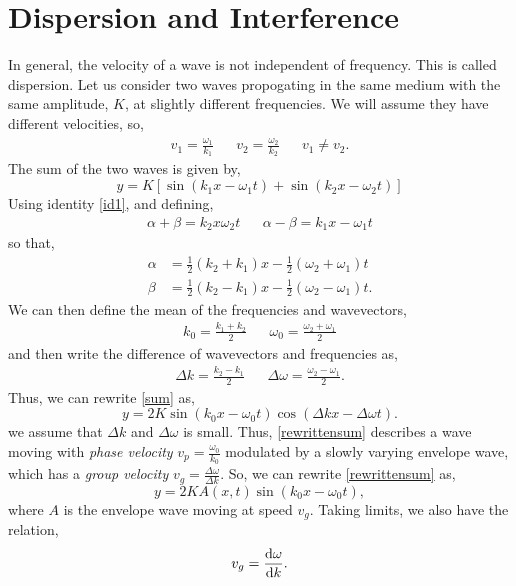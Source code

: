 \documentclass{book}
\begin{document}
\chapter{Dispersion and Interference}
In general, the velocity of a wave is not independent of frequency. This is called dispersion. Let us consider two waves propogating in the same medium with the same amplitude, $K$, at slightly different frequencies. We will assume they have different velocities, so,
\begin{align}
	v_1 = \frac{\omega_1}{k_1} && v_2 = \frac{\omega_2}{k_2} && v_1 \neq v_2.
\end{align}
The sum of the two waves is given by,
\begin{equation}
	y = K\left[\sin(k_1x -\omega_1t) + \sin(k_2x - \omega_2t)\right] \label{sum}
\end{equation}
Using identity \eqref{id1}, and defining,
\begin{align}
	\alpha + \beta = k_2x\omega_2t && \alpha - \beta = k_1x -\omega_1 t
\end{align}
so that,
\begin{align}
	\alpha & = \frac{1}{2}(k_2 + k_1)x - \frac{1}{2}(\omega_2 + \omega_1)t \\
	\beta & = \frac{1}{2}(k_2 - k_1)x - \frac{1}{2}(\omega_2 - \omega_1)t.
\end{align}
We can then define the mean of the frequencies and wavevectors,
\begin{align}
	k_0 = \frac{k_1 + k_2}{2} && \omega_0 = \frac{\omega_2 + \omega_1}{2}
\end{align}
and then write the difference of wavevectors and frequencies as,
\begin{align}
	\Delta k = \frac{k_2 - k_1}{2} && \Delta \omega = \frac{\omega_2 - \omega_1}{2}.
\end{align}
Thus, we can rewrite \eqref{sum} as,
\begin{equation}
	y = 2K\sin(k_0x - \omega_0 t)\cos(\Delta k x - \Delta\omega t).\label{rewrittensum}
\end{equation}
we assume that $\Delta k$ and $\Delta \omega$ is small. Thus, \eqref{rewrittensum} describes a wave moving with \textit{phase velocity} $v_p = \frac{\omega_0}{k_0}$ modulated by a slowly varying envelope wave, which has a \textit{group velocity} $v_g= \frac{\Delta \omega}{\Delta k}$. So, we can rewrite \eqref{rewrittensum} as,
\begin{equation}
	y = 2KA(x,t)\sin(k_0x - \omega_0 t),
\end{equation}
where $A$ is the envelope wave moving at speed $v_g$. Taking limits, we also have the relation,
\begin{equation}
	v_g = \dv{\omega}{k}.
\end{equation}
\end{document}
